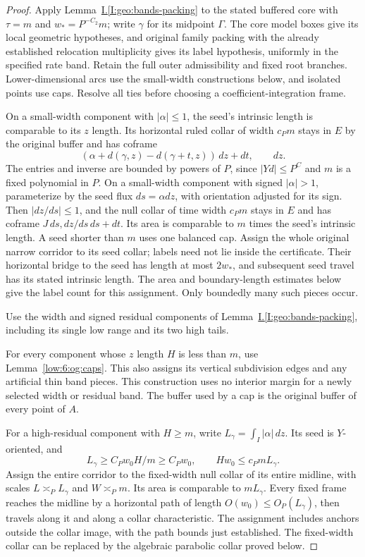 \documentclass[11pt]{amsart}
\theoremstyle{definition}
\theoremstyle{remark}
\numberwithin{equation}{section}
\newcommand{\partIref}[1]{\hyperref[I:#1]{I.\ref*{I:#1}}}
\begin{document}
\begin{proof}
Apply Lemma~\partIref{geo:bands-packing} to the stated buffered core with \(\tau=m\) and \(w_*=P^{-C_2}m\); write \(\gamma\) for its midpoint \(\Gamma\). The core model boxes give its local geometric hypotheses, and original family packing with the already established relocation multiplicity gives its label hypothesis, uniformly in the specified rate band. Retain the full outer admissibility and fixed root branches. Lower-dimensional arcs use the small-width constructions below, and isolated points use caps. Resolve all ties before choosing a coefficient-integration frame.

On a small-width component with \(|\alpha|\le1\), the seed's intrinsic length is comparable to its \(z\) length. Its horizontal ruled collar of width \(c_Pm\) stays in \(E\) by the original buffer and has coframe
\[
 (\alpha+d(\gamma,z)-d(\gamma+t,z))\,dz+dt,\qquad dz.
\]
The entries and inverse are bounded by powers of $P$, since $|Yd|\le P^C$ and $m$ is a fixed polynomial in $P$. On a small-width component with signed \(|\alpha|>1\), parameterize by the seed flux $ds=\alpha dz$, with orientation adjusted for its sign. Then $|dz/ds|\le1$, and the null collar of time width $c_Pm$ stays in $E$ and has coframe $J\,ds,dz/ds\,ds+dt$. Its area is comparable to $m$ times the seed's intrinsic length. A seed shorter than $m$ uses one balanced cap. Assign the whole original narrow corridor to its seed collar; labels need not lie inside the certificate. Their horizontal bridge to the seed has length at most $2w_*$, and subsequent seed travel has its stated intrinsic length. The area and boundary-length estimates below give the label count for this assignment. Only boundedly many such pieces occur.

Use the width and signed residual components of Lemma~\partIref{geo:bands-packing}, including its single low range and its two high tails.

For every component whose $z$ length $H$ is less than $m$, use Lemma~\ref{low:6:og:caps}. This also assigns its vertical subdivision edges and any artificial thin band pieces. This construction uses no interior margin for a newly selected width or residual band. The buffer used by a cap is the original buffer of every point of $A$.

For a high-residual component with $H\ge m$, write $L_\gamma=\int_I|\alpha|\,dz$. Its seed is $Y$-oriented, and
\[
L_\gamma\ge C_Pw_0H/m\ge C_Pw_0,\qquad Hw_0\le c_PmL_\gamma.
\]
Assign the entire corridor to the fixed-width null collar of its entire midline, with scales $L\asymp_PL_\gamma$ and $W\asymp_Pm$. Its area is comparable to $mL_\gamma$. Every fixed frame reaches the midline by a horizontal path of length $O(w_0)\le O_P(L_\gamma)$, then travels along it and along a collar characteristic. The assignment includes anchors outside the collar image, with the path bounds just established. The fixed-width collar can be replaced by the algebraic parabolic collar proved below.


\end{proof}
\end{document}

